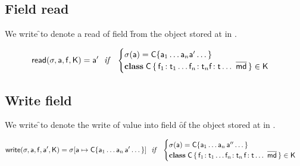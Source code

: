 \documentclass[a4paper,USenglish]{tex/lipics-v2016}
\begin{document}
\begin{mathpar}



\end{mathpar}


\subsection{Field read}

We write \readf\s\a\f\K to denote a read of field \f from the object
stored at \a in \s.

\begin{equation*}
\readf \s\a\f\K = \ap 
  ~~\mathit{if}~~ \begin{cases}  \s(\a) = \obj\C{\a_1\dots\a_n \ap \dots}\\
 \Class\C {\Fdef{\f_1}{\t_1}\dots\Fdef{\f_n}{\t_n}\Ftype\f\t\dots}{\b\md}\in\K
 \end{cases}
\end{equation*}

\subsection{Write field}

We write \setf\s\a\f\ap\K to denote the write of value \ap into field \f of
the object stored at \a in \s.

\begin{equation*}
\setf \s\a\f\ap\K= \Map\s{\Bind{\a}{\obj\C{\a_1\dots\a_n\,\ap\dots}}}
  ~~\mathit{if}~~ \begin{cases}
   \s(\a) = \obj\C{\a_1\dots\a_n\,\app\dots}\\
   \Class\C{\Fdef{\f_1}{\t_1}\dots\Fdef{\f_n}{\t_n}\,\Fdef\f\t\dots}{\b\md}\in\K
\end{cases}
\end{equation*}

\end{document}
